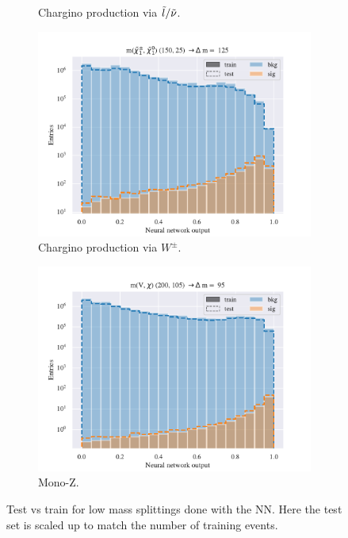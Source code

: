 \begin{figure}[H]
\begin{subfigure}[t!]{0.49\textwidth}
        \caption{Chargino production via $\Tilde{l}/\Tilde{\nu}$.}
        \label{fig:SlepsnuNNLow}
    \end{subfigure}    
    \begin{subfigure}[t!]{0.49\textwidth}
        \includegraphics[width = \textwidth]{Figures/WW/NN/Low_level/Low/scaled_train_test_395268.pdf}
        \caption{Chargino production via $W^\pm$.}
        \label{fig:WWNNLow}
    \end{subfigure}
    \begin{subfigure}[t!]{0.49\textwidth}
        \includegraphics[width = \textwidth]{Figures/Mono_Z/ML/NN/Low_level/Low/scaled_train_test_310604.pdf}
        \caption{Mono-Z.}
        \label{fig:MonoZNNLow}
    \end{subfigure}
    \caption{Test vs train for low mass splittings done with the NN. Here the test set is scaled up to match the number of training events.}
    \label{fig:AllLowNN}
\end{figure}



